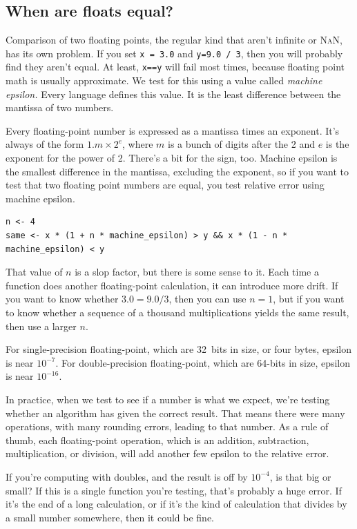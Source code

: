 \documentclass[fleqn,10pt]{olplainarticle}
\newcommand{\nan}{\textsc{NaN}\xspace}
\begin{document}
\subsection{When are floats equal?}

Comparison of two floating points, the regular kind that aren't
infinite or \nan, has its own problem. If you set
\lstinline!x = 3.0! and \lstinline!y=9.0 / 3!, then you will probably find they
aren't equal. At least, \lstinline!x==y! will fail most times, because
floating point math is usually approximate. We test for this
using a value called \emph{machine epsilon.} Every language defines
this value. It is the least difference between the
mantissa of two numbers.

Every floating-point number is expressed as a mantissa times
an exponent. It's always of the form $1.m \times 2^e$, where
$m$ is a bunch of digits after the 2 and $e$ is the exponent
for the power of 2. There's a bit for the sign, too.
Machine epsilon is the smallest difference in the mantissa,
excluding the exponent, so if you want to test that two
floating point numbers are equal, you test relative error using
machine epsilon.
\begin{lstlisting}
n <- 4
same <- x * (1 + n * machine_epsilon) > y && x * (1 - n * machine_epsilon) < y
\end{lstlisting}
That value of $n$ is a slop factor, but there is some sense
to it. Each time a function does another floating-point calculation,
it can introduce more drift. If you want to know whether
$3.0 = 9.0 / 3$, then you can use $n=1$, but if you want to know
whether a sequence of a thousand multiplications yields the
same result, then use a larger $n$.

For single-precision floating-point, which are 32~bits in size,
or four bytes, epsilon is near $10^{-7}$. For double-precision
floating-point, which are 64-bits in size, epsilon is near
$10^{-16}$.

In practice, when we test to see if a number is what we expect,
we're testing whether an algorithm has given the correct result.
That means there were many operations, with many rounding errors,
leading to that number. As a rule of thumb, each floating-point
operation, which is an addition, subtraction, multiplication,
or division, will add another few epsilon to the relative error.

If you're computing with doubles, and the result is off by $10^{-4}$,
is that big or small? If this is a single function you're testing,
that's probably a huge error. If it's the end of a long calculation,
or if it's the kind of calculation that divides by a small number somewhere,
then it could be fine.
\end{document}
